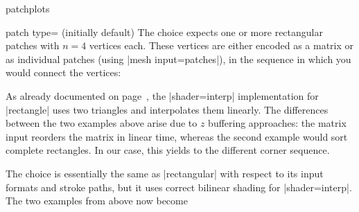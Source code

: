 \begin{pgfplotslibrary}{patchplots}
\begin{pgfplotskey}{patch type= (initially default)}
	The choice  expects one or more rectangular patches with $n=4$ vertices each. These vertices are either encoded as a matrix or as individual patches (using |mesh input=patches|), in the sequence in which you would connect the vertices:
\begin{codeexample}[]
\end{codeexample}
\begin{codeexample}[]
\end{codeexample}
	\noindent As already documented on page~\pageref{key:patch:type}, the |shader=interp| implementation for |rectangle| uses two triangles and interpolates them linearly. The differences between the two examples above arise due to $z$ buffering approaches: the matrix input reorders the matrix in linear time, whereas the second example would sort complete rectangles. In our case, this yields to the different corner sequence.

	The choice  is essentially the same as |rectangular| with respect to its input formats and stroke paths, but it uses correct bilinear shading for |shader=interp|. The two examples from above now become
\begin{codeexample}[]
\end{codeexample}
\begin{codeexample}[]
\end{codeexample}


\end{pgfplotskey}
\end{pgfplotslibrary}
